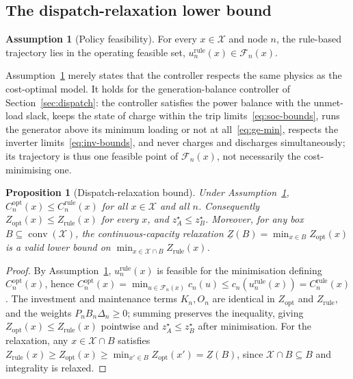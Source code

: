 \documentclass[11pt,a4paper]{article}
\theoremstyle{plain}
\newtheorem{proposition}{Proposition}
\theoremstyle{definition}
\newtheorem{assumption}{Assumption}
\begin{document}
\subsection{The dispatch-relaxation lower bound}

\begin{assumption}[Policy feasibility]
\label{ass:feas}
For every $x\in\mathcal{X}$ and node $n$, the rule-based trajectory lies in the operating
feasible set, $u^{\mathrm{rule}}_n(x)\in\mathcal{F}_n(x)$.
\end{assumption}

Assumption~\ref{ass:feas} merely states that the controller respects the same physics as
the cost-optimal model. It holds for the generation-balance controller of
Section~\ref{sec:dispatch}: the controller satisfies the power balance with the unmet-load
slack, keeps the state of charge within the trip limits~\eqref{eq:soc-bounds}, runs the
generator above its minimum loading or not at all~\eqref{eq:ge-min}, respects the inverter
limits~\eqref{eq:inv-bounds}, and never charges and discharges simultaneously; its
trajectory is thus one feasible point of $\mathcal{F}_n(x)$, not necessarily the
cost-minimising one.

\begin{proposition}[Dispatch-relaxation bound]
\label{prop:bound}
Under Assumption~\ref{ass:feas}, $C^{\mathrm{opt}}_n(x)\le C^{\mathrm{rule}}_n(x)$ for all
$x\in\mathcal{X}$ and all $n$. Consequently $Z_{\mathrm{opt}}(x)\le Z_{\mathrm{rule}}(x)$
for every $x$, and $z_A^\star\le z_B^\star$. Moreover, for any box
$B\subseteq\operatorname{conv}(\mathcal{X})$, the continuous-capacity relaxation
$\underline{Z}(B)=\min_{x\in B}Z_{\mathrm{opt}}(x)$ is a valid lower bound on
$\min_{x\in\mathcal{X}\cap B} Z_{\mathrm{rule}}(x)$.
\end{proposition}

\begin{proof}
By Assumption~\ref{ass:feas}, $u^{\mathrm{rule}}_n(x)$ is feasible for the minimisation
defining $C^{\mathrm{opt}}_n(x)$, hence
$C^{\mathrm{opt}}_n(x)=\min_{u\in\mathcal{F}_n(x)}c_n(u)\le
c_n(u^{\mathrm{rule}}_n(x))=C^{\mathrm{rule}}_n(x)$. The investment and maintenance terms
$K_n,O_n$ are identical in $Z_{\mathrm{opt}}$ and $Z_{\mathrm{rule}}$, and the weights
$P_n B_n\Delta_n\ge0$; summing preserves the inequality, giving
$Z_{\mathrm{opt}}(x)\le Z_{\mathrm{rule}}(x)$ pointwise and $z_A^\star\le z_B^\star$ after
minimisation. For the relaxation, any $x\in\mathcal{X}\cap B$ satisfies
$Z_{\mathrm{rule}}(x)\ge Z_{\mathrm{opt}}(x)\ge\min_{x'\in B}Z_{\mathrm{opt}}(x')
=\underline{Z}(B)$, since $\mathcal{X}\cap B\subseteq B$ and integrality is relaxed.
\end{proof}
\end{document}
